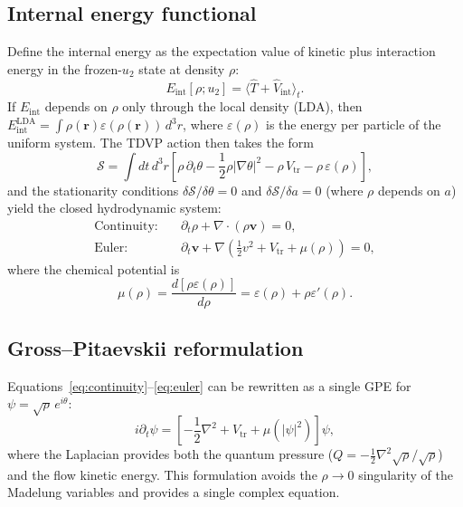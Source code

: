 \documentclass[aps,prl,onecolumn,superscriptaddress,longbibliography,nofootinbib]{revtex4-2}
\newcommand{\br}{\mathbf{r}}
\newcommand{\bv}{\mathbf{v}}
\newcommand{\avg}[1]{\langle #1 \rangle}
\begin{document}
\subsection{Internal energy functional}

Define the internal energy as the expectation value of kinetic plus
interaction energy in the frozen-$u_2$ state at density $\rho$:
\begin{equation}
E_{\mathrm{int}}[\rho;u_2] = \avg{\hat{T}+\hat{V}_{\mathrm{int}}}_t.
\end{equation}
If $E_{\mathrm{int}}$ depends on $\rho$ only through the local density
(LDA), then $E_{\mathrm{int}}^{\mathrm{LDA}} = \int\rho(\br)
\varepsilon(\rho(\br))\,d^3r$, where $\varepsilon(\rho)$ is the energy
per particle of the uniform system.  The TDVP action then takes the form
\begin{equation}
\mathcal{S} = \int\!dt\,d^3r\left[
\rho\,\partial_t\theta - \frac{1}{2}\rho|\nabla\theta|^2
- \rho\,V_{\mathrm{tr}} - \rho\,\varepsilon(\rho)\right],
\end{equation}
and the stationarity conditions $\delta\mathcal{S}/\delta\theta=0$
and $\delta\mathcal{S}/\delta a=0$ (where $\rho$ depends on $a$) yield
the closed hydrodynamic system:
\begin{align}
\text{Continuity:}\quad
&\partial_t\rho + \nabla\!\cdot(\rho\bv) = 0,
\label{eq:continuity}\\
\text{Euler:}\quad
&\partial_t\bv + \nabla\!\left(\frac{1}{2}v^2 + V_{\mathrm{tr}}
+ \mu(\rho)\right) = 0,
\label{eq:euler}
\end{align}
where the chemical potential is
\begin{equation}
\mu(\rho) = \frac{d[\rho\varepsilon(\rho)]}{d\rho}
= \varepsilon(\rho) + \rho\varepsilon'(\rho).
\end{equation}

\subsection{Gross--Pitaevskii reformulation}

Equations~\eqref{eq:continuity}--\eqref{eq:euler} can be rewritten as
a single GPE for $\psi=\sqrt\rho\,e^{i\theta}$:
\begin{equation}
i\partial_t\psi = \left[-\frac{1}{2}\nabla^2
+ V_{\mathrm{tr}} + \mu(|\psi|^2)\right]\psi,
\label{eq:gpe}
\end{equation}
where the Laplacian provides both the quantum pressure
($Q=-\frac{1}{2}\nabla^2\sqrt\rho/\sqrt\rho$) and the flow kinetic
energy.  This formulation avoids the $\rho\to 0$ singularity of the
Madelung variables and provides a single complex equation.
\end{document}
